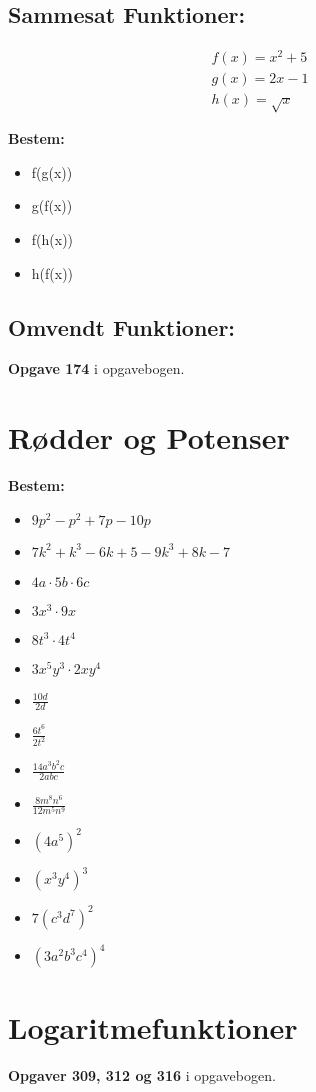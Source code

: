 \documentclass[10pt,a4paper]{article}
\begin{document}
\subsection{Sammesat Funktioner:}

\begin{align*}
f(x)=x^2+5\\
g(x)=2x-1\\
h(x)=\sqrt{x}
\end{align*}

\textbf{Bestem:}
\begin{itemize}
	\item f(g(x))
	\item g(f(x))
	\item f(h(x))
	\item h(f(x))
\end{itemize}

\subsection{Omvendt Funktioner:}
\textbf{Opgave 174} i opgavebogen.

\section{Rødder og Potenser}
\textbf{Bestem:}
\begin{itemize}
	\item $9p^2-p^2+7p-10p$
	\item $7k^2+k^3-6k+5-9k^3+8k-7$
	\item $4a \cdot 5b \cdot 6c$
	\item $3x^3 \cdot 9x$
	\item $8t^3 \cdot 4t^4$
	\item $3x^5y^3 \cdot 2xy^4$
	\item $\frac{10d}{2d}$
	\item $\frac{6t^6}{2t^2}$
	\item $\frac{14a^3b^2c}{2abc}$
	\item $\frac{8m^8n^6}{12m^5n^9}$
	\item $(4a^5)^2$
	\item $(x^3y^4)^3$
	\item $7(c^3d^7)^2$
	\item $(3a^2b^3c^4)^4$
\end{itemize}

\section{Logaritmefunktioner}
\textbf{Opgaver 309, 312 og 316} i opgavebogen.
\end{document}

